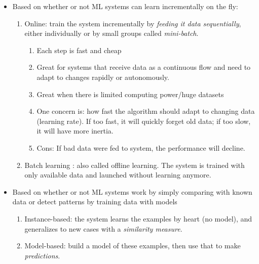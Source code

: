 \documentclass[12pt,oneside,a4paper]{article}
\numberwithin{equation}{section}
\begin{document}
\begin{itemize}
\item Based on whether or not ML systems can learn incrementally on the fly:
\begin{enumerate}
\item Online: train the system incrementally by \emph{feeding it data sequentially}, either individually or by small groups called \emph{mini-batch}. 
\begin{enumerate}
\item Each step is fast and cheap
\item Great for systems that receive data as a continuous flow and need to adapt to changes rapidly or autonomously. 
\item Great when there is limited computing power/huge datasets
\item One concern is: how fast the algorithm should adapt to changing data (learning rate). If too fast, it will quickly forget old data; if too slow, it will have more inertia.
\item Cons: If bad data were fed to system, the performance will decline.  
\end{enumerate} 
\item Batch learning : also called offline learning. The system is trained with only available data and launched without learning anymore. 
\end{enumerate}

\item Based on whether or not ML systems work by simply comparing with known data or detect patterns by training data with models 
\begin{enumerate}
\item Instance-based: the system learns the examples by heart (no model), and generalizes to new cases with a \emph{similarity measure}. 
\item Model-based: build a model of these examples, then use that to make \emph{predictions}. 
\end{enumerate}
\end{itemize}
\end{document}
